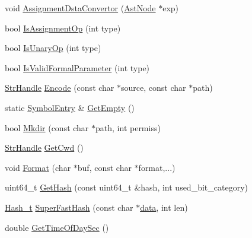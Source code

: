 \begin{DoxyCompactItemize}
\item 
void \hyperlink{namespacemocha_aa813517400ae9d773efdf037b6084d9b}{AssignmentDstaConvertor} (\hyperlink{classmocha_1_1_ast_node}{AstNode} $\ast$exp)
\item 
bool \hyperlink{namespacemocha_a048d679211eb878488328847ff0396ea}{IsAssignmentOp} (int type)
\item 
bool \hyperlink{namespacemocha_aad899d01e3c3688a90dc020dd26a012e}{IsUnaryOp} (int type)
\item 
bool \hyperlink{namespacemocha_ace4d0b39aec47d4115427d2863453806}{IsValidFormalParameter} (int type)
\item 
\hyperlink{classmocha_1_1_array_handle}{StrHandle} \hyperlink{namespacemocha_ad07edc8464514ef3d3813f949c4fa6b2}{Encode} (const char $\ast$source, const char $\ast$path)
\item 
static \hyperlink{namespacemocha_a692c3ca38973da32760e114599b8a960}{SymbolEntry} \& \hyperlink{namespacemocha_a47fb9891e57077a1c9872f4364213431}{GetEmpty} ()
\item 
bool \hyperlink{namespacemocha_a12714cf8fa4c996df95ecbe75c33784a}{Mkdir} (const char $\ast$path, int permiss)
\item 
\hyperlink{classmocha_1_1_array_handle}{StrHandle} \hyperlink{namespacemocha_a04d1511371e5d70dd43d1a4c24587013}{GetCwd} ()
\item 
void \hyperlink{namespacemocha_a2631d2302dee43ba444e727775129728}{Format} (char $\ast$buf, const char $\ast$format,...)
\item 
uint64\_\-t \hyperlink{namespacemocha_af7ec8feb8ef2af28e759b81d20322ecd}{GetHash} (const uint64\_\-t \&hash, int used\_\-bit\_\-category)
\item 
\hyperlink{namespacemocha_ac43feb383f32d7a0b18fc5866cf9ed5c}{Hash\_\-t} \hyperlink{namespacemocha_ac798fe588f3709b0f43c4f8267b58099}{SuperFastHash} (const char $\ast$\hyperlink{bootstrap_8cc_a923b2158227405b9f7a6eceb6c7104c8}{data}, int len)
\item 
double \hyperlink{namespacemocha_a57eebaee30ef2f3ac232d2c67b5429da}{GetTimeOfDaySec} ()
\end{DoxyCompactItemize}
